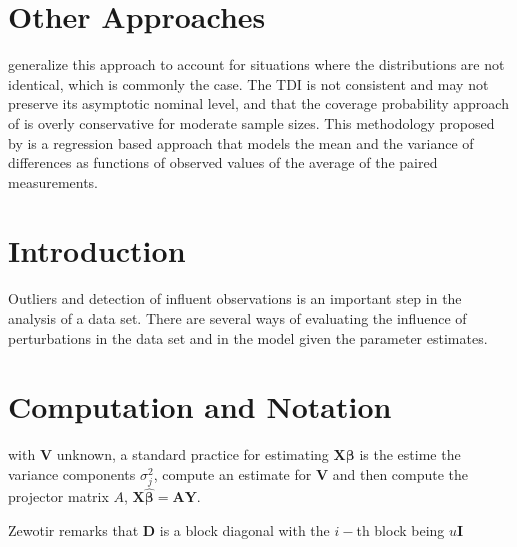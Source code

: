 \documentclass[12pt, a4paper]{report}
\theoremstyle{plain}
\theoremstyle{definition}
\theoremstyle{remark}
\begin{document}
\section{Other Approaches}


\citet{pkcng} generalize this approach to account for situations
where the distributions are not identical, which is commonly the
case. The TDI is not consistent and may not preserve its
asymptotic nominal level, and that the coverage probability
approach of \citet{lin2002} is overly conservative for moderate
sample sizes. This methodology proposed by \citet{pkcng} is a
regression based approach that models the mean and the variance of
differences as functions of observed values of the average of the
paired measurements.



\section{Introduction}

Outliers and detection of influent observations is an important step in the analysis of a data set. There are several ways of evaluating the influence of perturbations in the data set and in the model given the parameter estimates. 


\section{Computation and Notation } %
with $\boldsymbol{V}$ unknown, a standard practice for estimating $\boldsymbol{X \beta}$ is the estime the variance components $\sigma^2_j$,
compute an estimate for $\boldsymbol{V}$ and then compute the projector matrix $A$, $\boldsymbol{X \hat{\beta}}  = \boldsymbol{AY}$.


Zewotir remarks that $\boldsymbol{D}$ is a block diagonal with the $i-$th block being $u \boldsymbol{I}$





\end{document}
